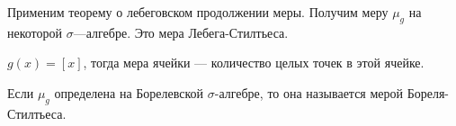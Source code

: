 Применим теорему о лебеговском продолжении меры. Получим меру \(\mu_g\) на некоторой \(\sigma\)---алгебре. Это мера Лебега-Стилтьеса.

\begin{example}
    \(g(x) = [x]\), тогда мера ячейки --- количество целых точек в этой ячейке.
\end{example}

Если \(\mu_g\) определена на Борелевской \(\sigma\)-алгебре, то она называется мерой Бореля-Стилтьеса.

